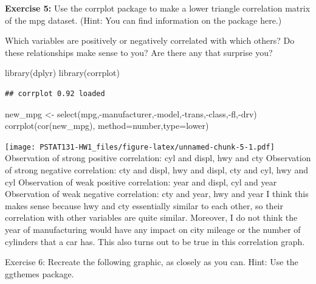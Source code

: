\documentclass[
]{article}
\newenvironment{Shaded}{\begin{snugshade}}{\end{snugshade}}
\newcommand{\AttributeTok}[1]{\textcolor[rgb]{0.77,0.63,0.00}{#1}}
\newcommand{\FunctionTok}[1]{\textcolor[rgb]{0.00,0.00,0.00}{#1}}
\newcommand{\NormalTok}[1]{#1}
\newcommand{\OtherTok}[1]{\textcolor[rgb]{0.56,0.35,0.01}{#1}}
\newcommand{\SpecialCharTok}[1]{\textcolor[rgb]{0.00,0.00,0.00}{#1}}
\newcommand{\StringTok}[1]{\textcolor[rgb]{0.31,0.60,0.02}{#1}}
\begin{document}
\textbf{Exercise 5:} Use the corrplot package to make a lower triangle
correlation matrix of the mpg dataset. (Hint: You can find information
on the package here.)

Which variables are positively or negatively correlated with which
others? Do these relationships make sense to you? Are there any that
surprise you?

\begin{Shaded}
\begin{Highlighting}[]
\FunctionTok{library}\NormalTok{(dplyr)}
\FunctionTok{library}\NormalTok{(corrplot)}
\end{Highlighting}
\end{Shaded}

\begin{verbatim}
## corrplot 0.92 loaded
\end{verbatim}

\begin{Shaded}
\begin{Highlighting}[]
\NormalTok{new\_mpg }\OtherTok{\textless{}{-}} \FunctionTok{select}\NormalTok{(mpg,}\SpecialCharTok{{-}}\NormalTok{manufacturer,}\SpecialCharTok{{-}}\NormalTok{model,}\SpecialCharTok{{-}}\NormalTok{trans,}\SpecialCharTok{{-}}\NormalTok{class,}\SpecialCharTok{{-}}\NormalTok{fl,}\SpecialCharTok{{-}}\NormalTok{drv)}
\FunctionTok{corrplot}\NormalTok{(}\FunctionTok{cor}\NormalTok{(new\_mpg), }\AttributeTok{method=}\StringTok{\textquotesingle{}number\textquotesingle{}}\NormalTok{,}\AttributeTok{type=}\StringTok{\textquotesingle{}lower\textquotesingle{}}\NormalTok{)}
\end{Highlighting}
\end{Shaded}

\texttt{[image: PSTAT131-HW1\_files/figure-latex/unnamed-chunk-5-1.pdf]}
Observation of strong positive correlation: cyl and displ, hwy and cty
Observation of strong negative correlation: cty and displ, hwy and
displ, cty and cyl, hwy and cyl Observation of weak positive
correlation: year and displ, cyl and year Observation of weak negative
correlation: cty and year, hwy and year I think this makes sense because
hwy and cty essentially similar to each other, so their correlation with
other variables are quite similar. Moreover, I do not think the year of
manufacturing would have any impact on city mileage or the number of
cylinders that a car has. This also turns out to be true in this
correlation graph.

Exercise 6: Recreate the following graphic, as closely as you can. Hint:
Use the ggthemes package.
\end{document}
